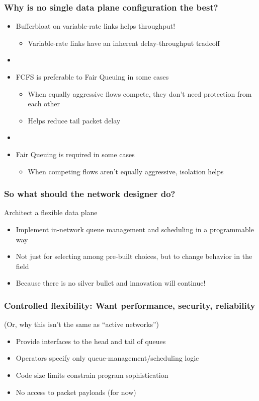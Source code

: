 \begin{frame}[plain]
\frametitle{Why is no single data plane configuration the best?}
\begin{itemize}
\item Bufferbloat on variable-rate links helps throughput!
      \begin{itemize}
      \item Variable-rate links have an inherent delay-throughput tradeoff
      \end{itemize} 

\item[] 

\item FCFS is preferable to Fair Queuing in some cases
      \begin{itemize}
      \item When equally aggressive flows compete, they don't need
        protection from each other
        \item Helps reduce tail packet delay
      \end{itemize}

\item[]

\item Fair Queuing is required in some cases
      \begin{itemize}      
      \item When competing flows aren't equally aggressive,
        isolation helps
      \end{itemize}
\end{itemize}
\end{frame}

\begin{frame}[plain]
\frametitle{So what should the network designer do?}
Architect a flexible data plane
\begin{itemize}
\item Implement in-network queue management and scheduling in a
  programmable way
\item Not just for selecting among pre-built choices, but to change
  behavior in the field
\item Because there is no silver bullet and innovation will continue!
\end{itemize}
\end{frame}

\begin{frame}[plain]
\frametitle{Controlled flexibility: Want performance, security,
  reliability}

(Or, why this isn't the same as ``active networks'')

\begin{itemize}
\item Provide interfaces to the head and tail of queues
\item Operators specify only queue-management/scheduling logic
\item Code size limits constrain program sophistication
\item No access to packet payloads (for now)
\end{itemize}
\end{frame}

